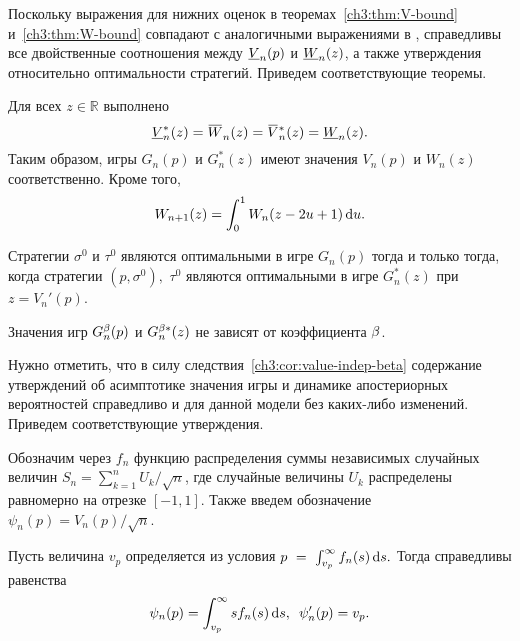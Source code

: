 {Поскольку выражения для нижних оценок в теоремах~\ref{ch3:thm:V-bound} и~\ref{ch3:thm:W-bound} совпадают с аналогичными выражениями в \cite{demeyer02}, справедливы все двойственные соотношения между $\LV{n}(p)$ и $\LW{n}(z)$, а также утверждения относительно оптимальности стратегий.
Приведем соответствующие теоремы.

\begin{theorem}
  Для всех $z \in \mathbb{R}$ выполнено
  \begin{equation}\label{ch3:eq:duality-relationships}
    \LV[*]{n}(z) = \HW{n}(z) = \HV[*]{n}(z) = \LW{n}(z).
  \end{equation}
  Таким образом, игры $G_n(p)$ и $G_n^*(z)$ имеют значения $V_n(p)$ и $W_n(z)$ соответственно.
  Кроме того,
  \begin{equation}\label{ch3:eq:W-recursive}
    W_{n+1}(z) = \int_0^1 W_n(z - 2u + 1) \mathop{}\!\mathrm{d} u.
  \end{equation}
\end{theorem}

\begin{theorem}\label{ch3:thm:optimal-strategies}
  Стратегии $\sigma^0$ и $\tau^0$ являются оптимальными в игре $G_n(p)$ тогда и только тогда, когда стратегии $(p, \sigma^0),$ $\tau^0$ являются оптимальными в игре $G_n^*(z)$ при $z = V_n'(p)$.
\end{theorem}

\begin{corollary}
  \label{ch3:cor:value-indep-beta}
  Значения игр $G^{\beta}_n(p)$ и $G^{\beta*}_n(z)$ не зависят от коэффициента $\beta$.
\end{corollary}

Нужно отметить, что в силу следствия~\ref{ch3:cor:value-indep-beta} содержание утверждений об асимптотике значения игры и динамике апостериорных вероятностей справедливо и для данной модели без каких-либо изменений.
Приведем соответствующие утверждения.

Обозначим через $f_n$ функцию распределения суммы независимых случайных величин $S_n = \sum_{k=1}^n U_k / \sqrt{n}$, где случайные величины $U_k$ распределены равномерно на отрезке $[-1, 1]$.
Также введем обозначение $\psi_n(p) = V_n(p)/\sqrt{n}$.

\begin{proposition}
Пусть величина $v_p$ определяется из условия 
$
  p~=~\int_{v_p}^\infty f_n(s) \mathop{}\!\mathrm{d} s.
$
Тогда справедливы равенства
\begin{equation*}
  \psi_n(p) = \int_{v_p}^\infty s f_n(s) \mathop{}\!\mathrm{d} s, \enskip
  \psi'_n(p) = v_p.
\end{equation*}
\end{proposition}

}
